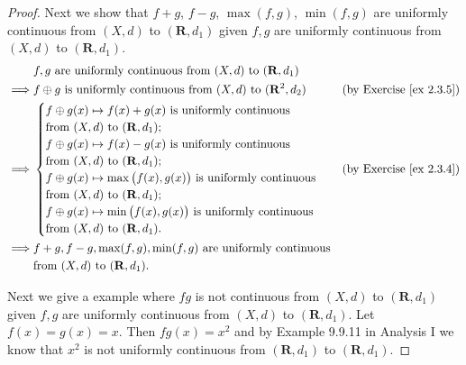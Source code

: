 \begin{proof}
    Next we show that \(f + g\), \(f - g\), \(\max(f, g)\), \(\min(f, g)\) are uniformly continuous from \((X, d)\) to \((\mathbf{R}, d_1)\) given \(f, g\) are uniformly continuous from \((X, d)\) to \((\mathbf{R}, d_1)\).
    \begin{align*}
                 & f, g \text{ are uniformly continuous from } (X, d) \text{ to } (\mathbf{R}, d_1)                                              \\
        \implies & f \oplus g \text{ is uniformly continuous from } (X, d) \text{ to } (\mathbf{R}^2, d_2) & \text{(by Exercise \ref{ex 2.3.5})} \\
        \implies & \begin{cases}
            f \oplus g(x) \mapsto f(x) + g(x) \text{ is uniformly continuous}              \\
            \text{from } (X, d) \text{ to } (\mathbf{R}, d_1);                             \\
            f \oplus g(x) \mapsto f(x) - g(x) \text{ is uniformly continuous}              \\
            \text{from } (X, d) \text{ to } (\mathbf{R}, d_1);                             \\
            f \oplus g(x) \mapsto \max\big(f(x), g(x)\big) \text{ is uniformly continuous} \\
            \text{from } (X, d) \text{ to } (\mathbf{R}, d_1);                             \\
            f \oplus g(x) \mapsto \min\big(f(x), g(x)\big) \text{ is uniformly continuous} \\
            \text{from } (X, d) \text{ to } (\mathbf{R}, d_1).
        \end{cases}                                                              & \text{(by Exercise \ref{ex 2.3.4})} \\
        \implies & f + g, f - g, \max(f, g), \min(f, g) \text{ are uniformly continuous}                                                         \\
                 & \text{from } (X, d) \text{ to } (\mathbf{R}, d_1).
    \end{align*}

    Next we give a example where \(fg\) is not continuous from \((X, d)\) to \((\mathbf{R}, d_1)\) given \(f, g\) are uniformly continuous from \((X, d)\) to \((\mathbf{R}, d_1)\).
    Let \(f(x) = g(x) = x\).
    Then \(fg(x) = x^2\) and by Example 9.9.11 in Analysis I we know that \(x^2\) is not uniformly continuous from \((\mathbf{R}, d_1)\) to \((\mathbf{R}, d_1)\).


\end{proof}
